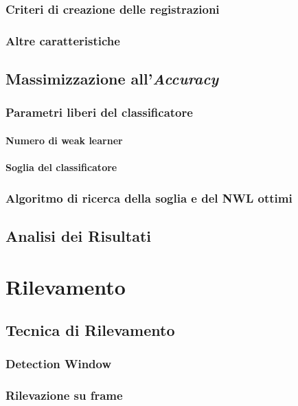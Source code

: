         \subsection{Criteri di creazione delle registrazioni}
        \subsection{Altre caratteristiche}
    \section{Massimizzazione all'\emph{Accuracy}}
    \label{sec:accuracy_maximization}
        \subsection{Parametri liberi del classificatore}
            \subsubsection{Numero di weak learner}
            \subsubsection{Soglia del classificatore}
        \subsection{Algoritmo di ricerca della soglia e del NWL ottimi}
    \section{Analisi dei Risultati}
    \label{sec:Analisi dei Risultati}

\chapter{Rilevamento}
\label{chap:rilevamento}
    \section{Tecnica di Rilevamento}
    \label{sec:detection_tecnique}
        \subsection{Detection Window}
        \subsection{Rilevazione su frame}
